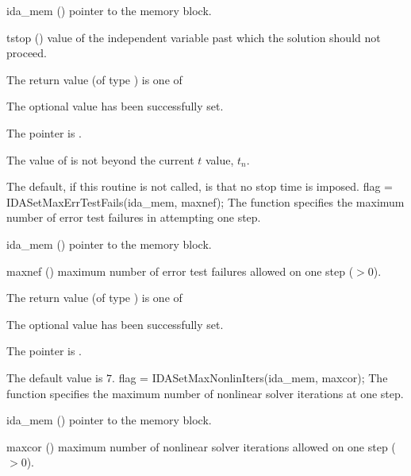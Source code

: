 {{}
{
  \begin{args}
  \item[ida\_mem] ()
    pointer to the {\ida} memory block.
  \item[tstop] ()
    value of the independent variable past which the solution should
    not proceed.
  \end{args}
}
{
  The return value  (of type ) is one of
  \begin{args}
  \item[\Id{IDA\_SUCCESS}] 
    The optional value has been successfully set.
  \item[\Id{IDA\_MEM\_NULL}] 
    The  pointer is .
  \item[\Id{IDA\_ILL\_INPUT}] 
    The value of  is not beyond the current $t$ value, $t_n$.
  \end{args}
}
{
  The default, if this routine is not called, is that no stop time is imposed.
}
{
flag = IDASetMaxErrTestFails(ida\_mem, maxnef);
}
{
  The function  specifies the
  maximum number of error test failures in attempting one step.
}
{
  \begin{args}
  \item[ida\_mem] ()
    pointer to the {\ida} memory block.
  \item[maxnef] ()
    maximum number of error test failures allowed on one step ($>0$).
  \end{args}
}
{
  The return value  (of type ) is one of
  \begin{args}
  \item[\Id{IDA\_SUCCESS}] 
    The optional value has been successfully set.
  \item[\Id{IDA\_MEM\_NULL}]
    The  pointer is .
  \end{args}
}
{
  The default value is $7$.
}
{
flag = IDASetMaxNonlinIters(ida\_mem, maxcor);
}
{
  The function  specifies the maximum
  number of nonlinear solver iterations at one step.
}
{
  \begin{args}
  \item[ida\_mem] ()
    pointer to the {\ida} memory block.
  \item[maxcor] ()
    maximum number of nonlinear solver iterations allowed on one step ($>0$).

\end{args}}}
